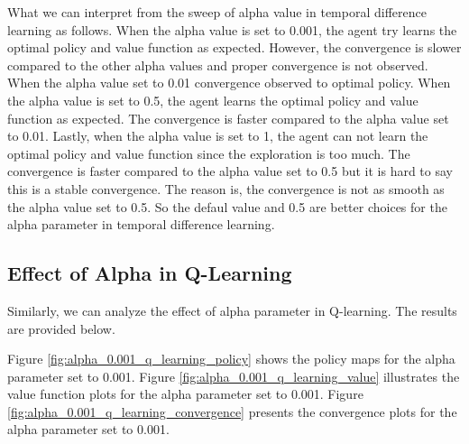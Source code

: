 \documentclass{assignment}
\begin{document}
What we can interpret from the sweep of alpha value in temporal difference learning as follows. When the alpha value is set to 0.001, the agent try learns the optimal policy and value function as expected. However, the convergence is slower compared to the other alpha values and proper convergence is not observed. When the alpha value set to 0.01 convergence observed to optimal policy. When the alpha value is set to 0.5, the agent learns the optimal policy and value function as expected. The convergence is faster compared to the alpha value set to 0.01. Lastly, when the alpha value is set to 1, the agent can not learn the optimal policy and value function since the exploration is too much. The convergence is faster compared to the alpha value set to 0.5 but it is hard to say this is a stable convergence. The reason is, the convergence is not as smooth as the alpha value set to 0.5. So the defaul value and 0.5 are better choices for the alpha parameter in temporal difference learning.


\subsection{Effect of Alpha in Q-Learning}
Similarly, we can analyze the effect of alpha parameter in Q-learning. The results are provided below.

Figure \ref{fig:alpha_0.001_q_learning_policy} shows the policy maps for the alpha parameter set to 0.001. Figure \ref{fig:alpha_0.001_q_learning_value} illustrates the value function plots for the alpha parameter set to 0.001. Figure \ref{fig:alpha_0.001_q_learning_convergence} presents the convergence plots for the alpha parameter set to 0.001.
\end{document}
